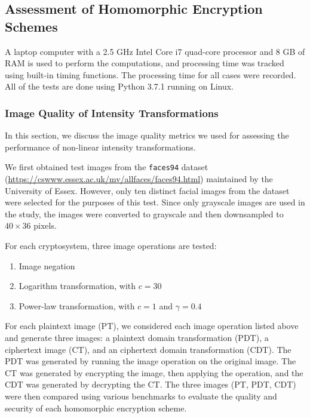 \subsection{Assessment of Homomorphic Encryption Schemes}
A laptop computer with a 2.5 GHz Intel Core i7 quad-core processor and 8 GB of RAM is used to perform the computations, and processing time was tracked using built-in timing functions. The processing time for all cases were recorded. All of the tests are done using Python 3.7.1 running on Linux.

\subsubsection{Image Quality of Intensity Transformations}
In this section, we discuss the image quality metrics we used for assessing the performance of non-linear intensity transformations.

We first obtained test images from the \texttt{faces94} dataset (\url{https://cswww.essex.ac.uk/mv/allfaces/faces94.html}) maintained by the University of Essex. However, only ten distinct facial images from the dataset were selected for the purposes of this test. Since only grayscale images are used in the study, the images were converted to grayscale and then downsampled to $40 \times 36$ pixels.

For each cryptosystem, three image operations are tested:
\begin{enumerate}
	\item Image negation
	\item Logarithm transformation, with $c = 30$
	\item Power-law transformation, with $c = 1$ and $\gamma = 0.4$
\end{enumerate}

For each plaintext image (PT), we considered each image operation listed above and generate three images: a plaintext domain transformation (PDT), a ciphertext image (CT), and an ciphertext domain transformation (CDT). The PDT was generated by running the image operation on the original image. The CT was generated by encrypting the image, then applying the operation, and the CDT was generated by decrypting the CT. The three images (PT, PDT, CDT) were then compared using various benchmarks to evaluate the quality and security of each homomorphic encryption scheme.

